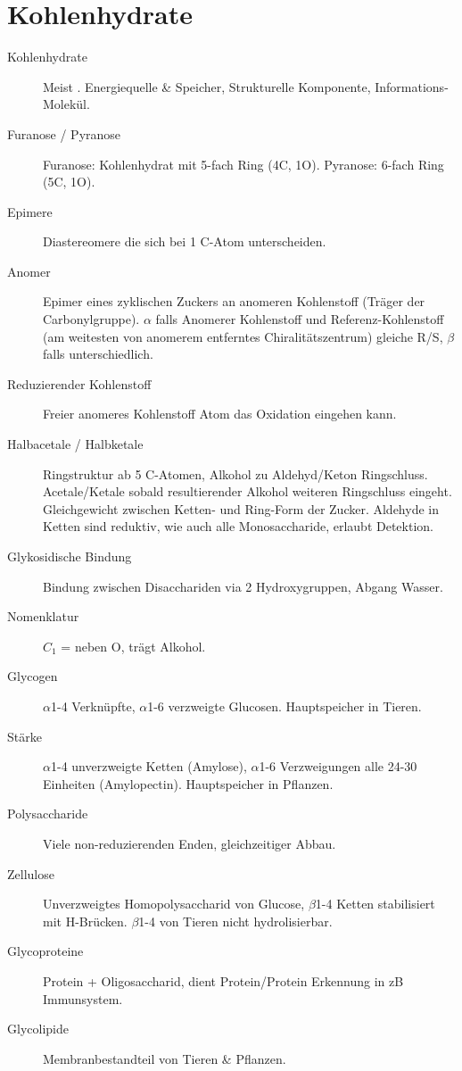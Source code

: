 \documentclass[a4paper,twocolumn,english,fontsize=7,DIV=16]{scrartcl}
\begin{document}
\section{Kohlenhydrate}

\begin{description}
	\item[Kohlenhydrate] Meist . Energiequelle \& Speicher,
		Strukturelle Komponente, Informations-Molekül.
	\item[Furanose / Pyranose] Furanose: Kohlenhydrat mit 5-fach Ring (4C, 1O).
		Pyranose: 6-fach Ring (5C, 1O).
	\item[Epimere] Diastereomere die sich bei 1 C-Atom unterscheiden.
	\item[Anomer] Epimer eines zyklischen Zuckers an anomeren Kohlenstoff
		(Träger der Carbonylgruppe). $\alpha$ falls Anomerer
		Kohlenstoff und Referenz-Kohlenstoff (am weitesten von anomerem
		entferntes Chiralitätszentrum) gleiche R/S, $\beta$ falls
		unterschiedlich.
	\item[Reduzierender Kohlenstoff] Freier anomeres Kohlenstoff Atom das
		Oxidation eingehen kann.
	\item[Halbacetale / Halbketale] Ringstruktur ab 5 C-Atomen, Alkohol zu
		Aldehyd/Keton Ringschluss. Acetale/Ketale sobald resultierender
		Alkohol weiteren Ringschluss eingeht. Gleichgewicht zwischen
		Ketten- und Ring-Form der Zucker. Aldehyde in Ketten sind
		reduktiv, wie auch alle Monosaccharide, erlaubt Detektion.
	\item[Glykosidische Bindung] Bindung zwischen Disacchariden via 2
		Hydroxygruppen, Abgang Wasser.
	\item[Nomenklatur] $C_1$ = neben O, trägt Alkohol.
	\item[Glycogen] $\alpha$1-4 Verknüpfte, $\alpha$1-6 verzweigte
		Glucosen. Hauptspeicher in Tieren.
	\item[Stärke] $\alpha$1-4 unverzweigte Ketten (Amylose), $\alpha$1-6
		Verzweigungen alle 24-30 Einheiten (Amylopectin). Hauptspeicher
		in Pflanzen.
	\item[Polysaccharide] Viele non-reduzierenden Enden, gleichzeitiger Abbau.
	\item[Zellulose] Unverzweigtes Homopolysaccharid von Glucose,
		$\beta$1-4 Ketten stabilisiert mit H-Brücken. $\beta$1-4 von
		Tieren nicht hydrolisierbar.
	\item[Glycoproteine] Protein + Oligosaccharid, dient Protein/Protein
		Erkennung in zB Immunsystem.
	\item[Glycolipide] Membranbestandteil von Tieren \& Pflanzen.
\end{description}
\end{document}
